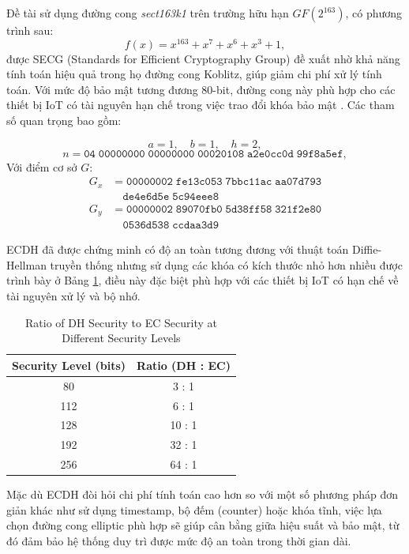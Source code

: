 Đề tài sử dụng đường cong \textit{sect163k1} trên trường hữu hạn $GF(2^{163})$, có phương trình sau:
\[
f(x) = x^{163} + x^7 + x^6 + x^3 + 1,
\]
được SECG (Standards for Efficient Cryptography Group) đề xuất nhờ khả năng tính toán hiệu quả trong họ đường cong Koblitz, giúp giảm chi phí xử lý tính toán. Với mức độ bảo mật tương đương 80-bit, đường cong này phù hợp cho các thiết bị IoT có tài nguyên hạn chế trong việc trao đổi khóa bảo mật \cite{secg}. Các tham số quan trọng bao gồm:

\[
a = 1, \quad b = 1, \quad h = 2,
\]
\[
n = \mathtt{04\; 00000000\; 00000000\; 00020108\; a2e0cc0d\; 99f8a5ef},
\]
Với điểm cơ sở \(G\):
\[
\begin{aligned}
G_x &= \mathtt{00000002\; fe13c053\; 7bbc11ac\; aa07d793} \\
    &\quad \mathtt{de4e6d5e\; 5c94eee8} \\
G_y &= \mathtt{00000002\; 89070fb0\; 5d38ff58\; 321f2e80} \\
    &\quad \mathtt{0536d538\; ccdaa3d9}
\end{aligned}
\]

ECDH đã được chứng minh có độ an toàn tương đương với thuật toán Diffie-Hellman truyền thống nhưng sử dụng các khóa có kích thước nhỏ hơn nhiều \cite{?} được trình bày ở Bảng \ref{tab:dh_ec_security}, điều này đặc biệt phù hợp với các thiết bị IoT có hạn chế về tài nguyên xử lý và bộ nhớ.

\begin{table}[h]
\centering
\small
\caption{Ratio of DH Security to EC Security at Different Security Levels}
\label{tab:dh_ec_security}
\begin{tabular}{|c|c|}
\hline
\textbf{Security Level (bits)} & \textbf{Ratio (DH : EC)} \\
\hline
80  & 3 : 1  \\
\hline
112 & 6 : 1  \\
\hline
128 & 10 : 1 \\
\hline
192 & 32 : 1 \\
\hline
256 & 64 : 1 \\
\hline
\end{tabular}
\end{table}

Mặc dù ECDH đòi hỏi chi phí tính toán cao hơn so với một số phương pháp đơn giản khác như sử dụng timestamp, bộ đếm (counter) hoặc khóa tĩnh, việc lựa chọn đường cong elliptic phù hợp sẽ giúp cân bằng giữa hiệu suất và bảo mật, từ đó đảm bảo hệ thống duy trì được mức độ an toàn trong thời gian dài.

